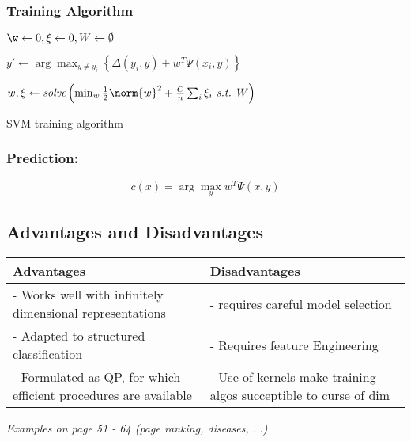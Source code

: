 \subsubsection{Training Algorithm}
\begin{algorithm}[H]  
	$\w\gets 0, \xi\gets 0, W\gets \emptyset$ \\
   {
   		{
			$y'\gets \arg\max_{y\neq y_i} \left\{ \Delta(y_i, y) + w^T\Psi(x_i, y)\right\}$ 
			
      	}
      	$w, \xi \gets \textit{solve}\left(\min_w \frac{1}{2} \norm{w}^2 + \frac{C}{n} \sum_i\xi_i \textit{ s.t. } W \right)$
  	}
  \caption{SVM training algorithm}
\end{algorithm}
	
\subsubsection{Prediction: }
$$
	c(x) = \arg\max_y w^T\Psi(x,y)
$$

\subsection{Advantages and Disadvantages}
\begin{center}
	\begin{tabular}{ p{} | p{} } 
		\textbf{Advantages} & \textbf{Disadvantages}\\\hline
			- Works well with infinitely dimensional representations & - requires careful model selection \\
			-  Adapted to structured classification & - Requires feature Engineering \\
			- Formulated as QP, for which efficient procedures are available & - Use of kernels make training algos succeptible to curse of dim
	
	\end{tabular}
\end{center}

\textit{Examples on page 51 - 64 (page ranking, diseases, ...)}
	
	
